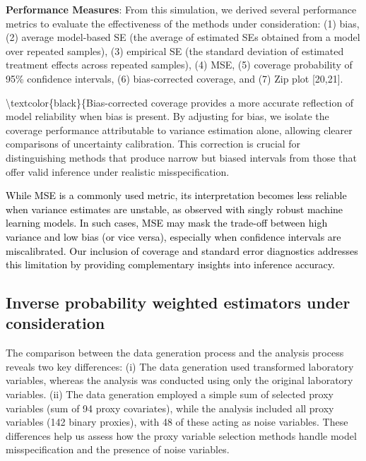 \documentclass[10pt,letterpaper]{article}
\begin{document}
\textbf{Performance Measures}: From this simulation, we derived several
performance metrics to evaluate the effectiveness of the methods under
consideration: (1) bias, (2) average model-based SE (the average of
estimated SEs obtained from a model over repeated samples), (3)
empirical SE (the standard deviation of estimated treatment effects
across repeated samples), (4) MSE, (5) coverage probability of 95\%
confidence intervals, (6) bias-corrected coverage, and (7) Zip plot
{[}20,21{]}.

\textbackslash textcolor\{black\}\{Bias-corrected coverage provides a
more accurate reflection of model reliability when bias is present. By
adjusting for bias, we isolate the coverage performance attributable to
variance estimation alone, allowing clearer comparisons of uncertainty
calibration. This correction is crucial for distinguishing methods that
produce narrow but biased intervals from those that offer valid
inference under realistic misspecification.

\textcolor{black}{While MSE is a commonly used metric, its interpretation becomes less reliable when variance estimates are unstable, as observed with singly robust machine learning models. In such cases, MSE may mask the trade-off between high variance and low bias (or vice versa), especially when confidence intervals are miscalibrated. Our inclusion of coverage and standard error diagnostics addresses this limitation by providing complementary insights into inference accuracy.}

\subsection*{Inverse probability weighted estimators under
consideration}\label{inverse-probability-weighted-estimators-under-consideration}

The comparison between the data generation process and the analysis
process reveals two key differences: (i) The data generation used
transformed laboratory variables, whereas the analysis was conducted
using only the original laboratory variables. (ii) The data generation
employed a simple sum of selected proxy variables (sum of 94 proxy
covariates), while the analysis included all proxy variables (142 binary
proxies), with 48 of these acting as noise variables. These differences
help us assess how the proxy variable selection methods handle model
misspecification and the presence of noise variables.
\end{document}
